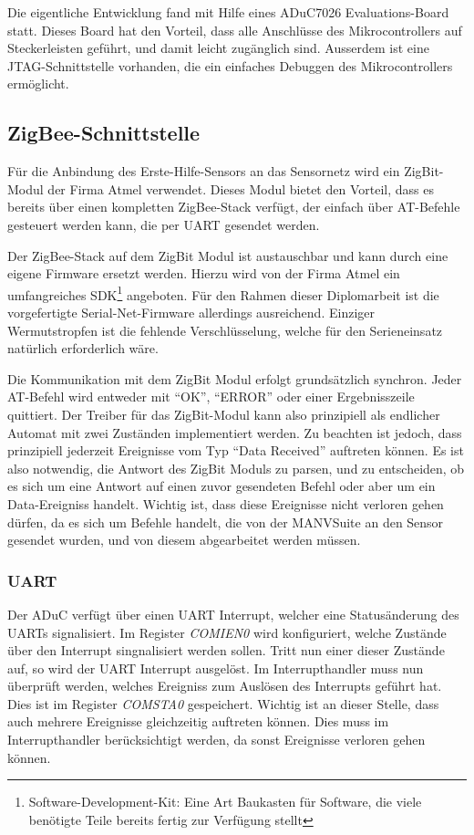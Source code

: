 Die eigentliche Entwicklung fand mit Hilfe eines ADuC7026 Evaluations-Board statt. Dieses Board hat den Vorteil, 
dass alle Anschlüsse des Mikrocontrollers auf Steckerleisten geführt, und damit leicht zugänglich sind. Ausserdem
ist eine JTAG-Schnittstelle vorhanden, die ein einfaches Debuggen des Mikrocontrollers ermöglicht.

\subsection{ZigBee-Schnittstelle}
Für die Anbindung des Erste-Hilfe-Sensors an das Sensornetz wird ein ZigBit-Modul der Firma Atmel verwendet. 
Dieses Modul bietet den Vorteil, dass es bereits über einen kompletten ZigBee-Stack verfügt, der einfach über
AT-Befehle gesteuert werden kann, die per UART gesendet werden.

Der ZigBee-Stack auf dem ZigBit Modul ist austauschbar und kann durch eine eigene Firmware ersetzt werden.
Hierzu wird von der Firma Atmel ein umfangreiches SDK\footnote{Software-Development-Kit: Eine Art Baukasten für
Software, die viele benötigte Teile bereits fertig zur Verfügung stellt} angeboten. Für den Rahmen dieser Diplomarbeit
ist die vorgefertigte Serial-Net-Firmware allerdings ausreichend. Einziger Wermutstropfen ist die fehlende
Verschlüsselung, welche für den Serieneinsatz natürlich erforderlich wäre.

Die Kommunikation mit dem ZigBit Modul erfolgt grundsätzlich synchron. Jeder AT-Befehl wird entweder mit 
"`OK"', "`ERROR"' oder einer Ergebnisszeile quittiert. Der Treiber für das ZigBit-Modul kann also prinzipiell
als endlicher Automat mit zwei Zuständen implementiert werden. Zu beachten ist jedoch, dass prinzipiell
jederzeit Ereignisse vom Typ "`Data Received"' auftreten können. Es ist also notwendig, die Antwort des 
ZigBit Moduls zu parsen, und zu entscheiden, ob es sich um eine Antwort auf einen zuvor gesendeten Befehl
oder aber um ein Data-Ereigniss handelt. Wichtig ist, dass diese Ereignisse nicht verloren gehen dürfen,
da es sich um Befehle handelt, die von der MANVSuite an den Sensor gesendet wurden, und von diesem 
abgearbeitet werden müssen. 


\subsubsection{UART}
Der ADuC verfügt über einen UART Interrupt, welcher eine Statusänderung des UARTs signalisiert. Im Register 
\textsl{COMIEN0} wird konfiguriert, welche Zustände über den Interrupt singnalisiert werden sollen. Tritt
nun einer dieser Zustände auf, so wird der UART Interrupt ausgelöst. Im Interrupthandler muss nun überprüft
werden, welches Ereigniss zum Auslösen des Interrupts geführt hat. Dies ist im Register \textsl{COMSTA0} 
gespeichert. Wichtig ist an dieser Stelle, dass auch mehrere Ereignisse gleichzeitig auftreten können. 
Dies muss im Interrupthandler berücksichtigt werden, da sonst Ereignisse verloren gehen können.

